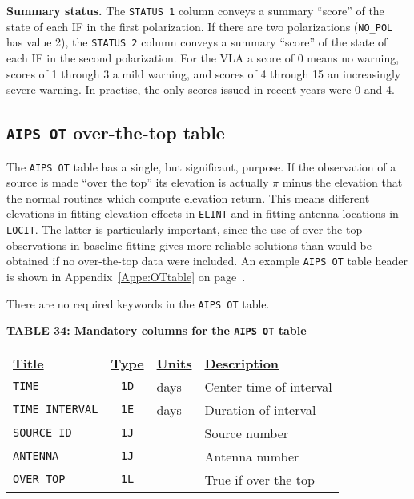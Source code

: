 \documentclass[twoside]{article}
\begin{document}
{\bf Summary status.}  The {\tt STATUS 1} column conveys a summary
``score'' of the state of each IF in the first polarization.  If there
are two polarizations ({\tt NO\_POL} has value 2), the {\tt STATUS 2}
column conveys a summary ``score'' of the state of each IF in the
second polarization.  For the VLA a score of 0 means no warning,
scores of 1 through 3 a mild warning, and scores of 4 through 15 an
increasingly severe warning.  In practise, the only scores issued in
recent years were 0 and 4.

\subsection{{\tt AIPS OT} over-the-top table}
\label{s:OT}

The {\tt AIPS OT} table has a single, but significant, purpose.  If
the observation of a source is made ``over the top'' its elevation is
actually $\pi$ minus the elevation that the normal routines which
compute elevation return.  This means different elevations in fitting
elevation effects in {\tt ELINT} and in fitting antenna locations in
{\tt LOCIT}\@.  The latter is particularly important, since the use of
over-the-top observations in baseline fitting gives more reliable
solutions than would be obtained if no over-the-top data were
included.  An example {\tt AIPS OT} table header is shown in
Appendix~\ref{Appe:OTtable} on page~\pageref{Appe:OTtable}.

There are no required keywords in the {\tt AIPS OT} table.
\vfill\eject

\begin{center}
\underline{\bf{TABLE 34: Mandatory columns for the {\tt AIPS OT} table}}\\
\begin{tabular}{lcll}
\noalign{\vspace{2pt}} \label{ta:OTcols}
\underline{{\bf Title\vphantom{y}}} & \underline{\bf{Type}} &
   \underline{{\bf Units\vphantom{y}}} & \underline{\bf{Description}} \\
\noalign{\vspace{2pt}}
{\tt TIME}          & {\tt 1D} & days & Center time of interval \\
{\tt TIME INTERVAL} & {\tt 1E} & days & Duration of interval \\
{\tt SOURCE ID}     & {\tt 1J} &      & Source number \\
{\tt ANTENNA}       & {\tt 1J} &      & Antenna number \\
{\tt OVER TOP}      & {\tt 1L} &      & True if over the top
\end{tabular}
\end{center}
\end{document}
